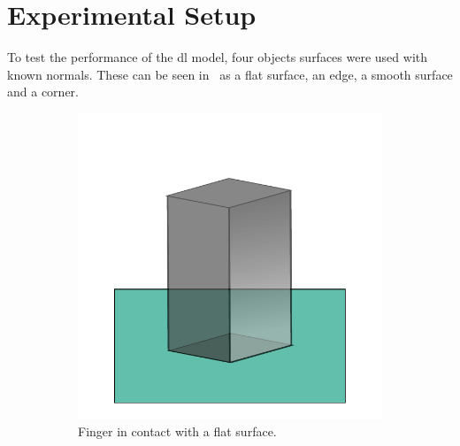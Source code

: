 \section{Experimental Setup}\label{sec:1-tactile-perception-experimental-setup}

To test the performance of the \gls{dl} model, four objects surfaces were used with known normals. These can be seen in~ as a flat surface, an edge, a smooth surface and a corner.

\begin{figure}[h]
	\centering
	\begin{subfigure}[b]{0.24\textwidth}
		\centering
		\includegraphics[width=\textwidth]{chapters/1-tactile-perception/fig/experimental-setup/flat-contact-3d.pdf}
		\caption{Finger in contact with a flat surface.}
		\label{fig:flat-contact}
	\end{subfigure}
	\hfill
	\begin{subfigure}[b]{0.24\textwidth}
		\centering

\end{subfigure}
\end{figure}
